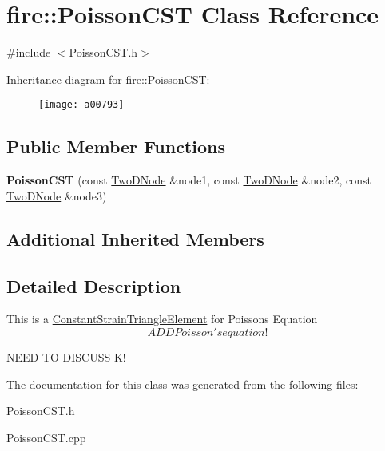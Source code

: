 \hypertarget{a00793}{}\section{fire\+:\+:Poisson\+C\+ST Class Reference}
\label{a00793}


{\ttfamily \#include $<$Poisson\+C\+S\+T.\+h$>$}

Inheritance diagram for fire\+:\+:Poisson\+C\+ST\+:\begin{figure}[H]
\begin{center}
\leavevmode
\texttt{[image: a00793]}
\end{center}
\end{figure}
\subsection*{Public Member Functions}
\begin{DoxyCompactItemize}
\item 
\mbox{\label{a00793_ab45e61d417f5bbf0803d884bfb2db07f}} 
{\bfseries Poisson\+C\+ST} (const \hyperlink{a00198_a92dafcc05a788e1065a5792b67f0f70e}{Two\+D\+Node} \&node1, const \hyperlink{a00198_a92dafcc05a788e1065a5792b67f0f70e}{Two\+D\+Node} \&node2, const \hyperlink{a00198_a92dafcc05a788e1065a5792b67f0f70e}{Two\+D\+Node} \&node3)
\end{DoxyCompactItemize}
\subsection*{Additional Inherited Members}


\subsection{Detailed Description}
This is a \hyperlink{a00773}{Constant\+Strain\+Triangle\+Element} for Poisson\textquotesingle{}s Equation \[ ADD Poisson's equation! \]

N\+E\+ED TO D\+I\+S\+C\+U\+SS K! 

The documentation for this class was generated from the following files\+:\begin{DoxyCompactItemize}
\item 
Poisson\+C\+S\+T.\+h\item 
Poisson\+C\+S\+T.\+cpp\end{DoxyCompactItemize}
